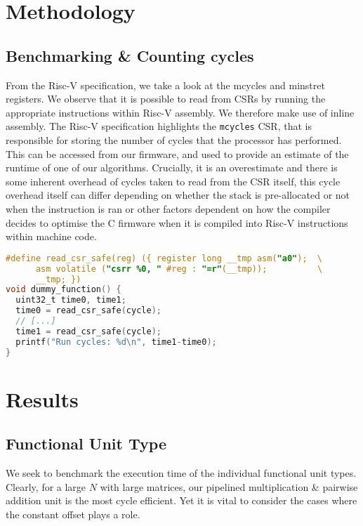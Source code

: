 \documentclass[a4paper,8pt]{report}
\begin{document}
\section{Methodology}
\subsection{Benchmarking \& Counting cycles}
From the Risc-V specification, we take a look at the mcycles and minstret
registers. We observe that it is possible to read from CSRs by running the
appropriate instructions within Risc-V assembly. We therefore make use of inline
assembly. The Risc-V specification highlights the \texttt{mcycles} CSR, that is
responsible for storing the number of cycles that the processor has performed.
This can be accessed from our firmware, and used to provide an estimate of the
runtime of one of our algorithms. Crucially, it is an overestimate and there is
some inherent overhead of cycles taken to read from the CSR itself, this
cycle overhead itself can differ depending on whether the stack is pre-allocated
or not when the instruction is ran or other factors dependent on how the
compiler decides to optimise the C firmware when it is compiled into Risc-V
instructions within machine code.

\begin{lstlisting}[language=C,style=customc]
#define read_csr_safe(reg) ({ register long __tmp asm("a0");  \
      asm volatile ("csrr %0, " #reg : "=r"(__tmp));          \
      __tmp; })
void dummy_function() {
  uint32_t time0, time1;
  time0 = read_csr_safe(cycle);
  // [...]
  time1 = read_csr_safe(cycle);
  printf("Run cycles: %d\n", time1-time0);
}

\end{lstlisting}


\section{Results}
\subsection{Functional Unit Type}
We seek to benchmark the execution time of the individual functional unit types.
Clearly, for a large $N$ with large matrices, our pipelined multiplication \&
pairwise addition unit is the most cycle efficient. Yet it is vital to consider
the cases where the constant offset plays a role. 

\end{document}
